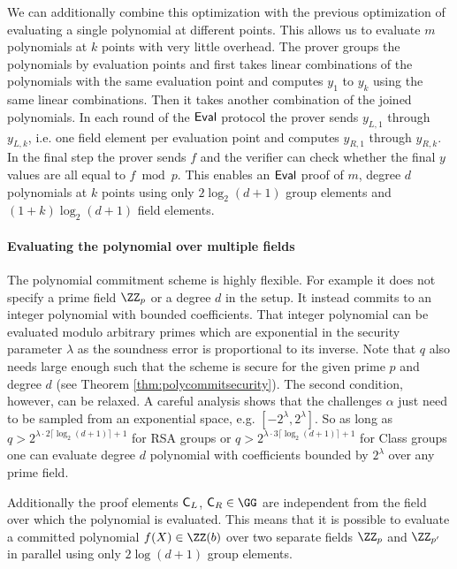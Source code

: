 We can additionally combine this optimization with the previous optimization of evaluating a single polynomial at different points. This allows us to evaluate $m$ polynomials at $k$ points with very little overhead. 
The prover groups the polynomials by evaluation points and first takes linear combinations of the polynomials with the same evaluation point and computes $y_1$ to $y_k$ using the same linear combinations. Then it takes another combination of the joined polynomials. In each round of the $\textsf{{Eval}}$ protocol the prover sends $y_{L,1}$ through $y_{L,k}$, i.e. one field element per evaluation point and computes $y_{R,1}$ through $y_{R,k}$. In the final step the prover sends $f$ and the verifier can check whether the final $y$ values are all equal to $f\bmod p$.
 This enables an $\textsf{{Eval}}$ proof of $m$, degree $d$ polynomials at $k$ points using only $2\log_2(d+1)$ group elements and $(1+k)\log_2(d+1)$ field elements.
 
\paragraph{Evaluating the polynomial over multiple fields}
The polynomial commitment scheme is highly flexible. For example it does not specify a prime field $\ZZ_p$ or a degree $d$ in the setup. It instead commits to an integer polynomial with bounded coefficients. That integer polynomial can be evaluated modulo arbitrary primes which are exponential in the security parameter $\lambda$ as the soundness error is proportional to its inverse.
Note that $q$ also needs large enough such that the scheme is secure for the given prime $p$ and degree $d$ (see Theorem \ref{thm:polycommitsecurity}). The second condition, however, can be relaxed. A careful analysis shows that the challenges $\alpha$ just need to be sampled from an exponential space, e.g. $[-2^{\lambda},2^{\lambda}]$. So as long as $q>2^{\lambda\cdot 2\lceil \log_2(d+1)\rceil+1}$ for RSA groups or  $q>2^{\lambda \cdot 3\lceil \log_2(d+1)\rceil+1}$ for Class groups one can evaluate degree $d$ polynomial with coefficients bounded by $2^\lambda$ over any prime field.

Additionally the proof elements $\mathsf{C}_L$, $\gr{C}_R \in \GG$ are independent from the field over which the polynomial is evaluated. This means that it is possible to evaluate a committed polynomial $f(X) \in \ZZ(b)$ over two separate fields $\ZZ_{p}$ and $\ZZ_{p'}$ in parallel using only $2\log(d+1)$ group elements. 



